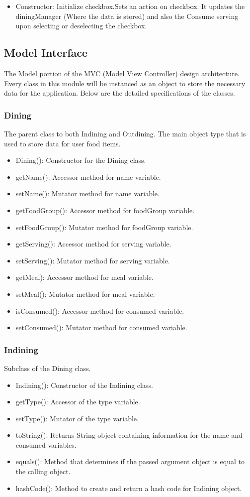 \documentclass{scrreprt}
\begin{document}
\begin{itemize}
	\item Constructor: Initialize checkbox.Sets an action on checkbox. It updates the diningManager (Where the data is stored) and also the Consume serving upon selecting or deselecting the checkbox.
\end{itemize}
\subsection{Model Interface}
The Model portion of the MVC (Model View Controller) design architecture. Every class in this module will be instanced as an object to store the necessary data for the application. Below are the detailed specifications of the classes.

\subsubsection{Dining}
The parent class to both Indining and Outdining. The main object type that is used to store data for user food items.
\begin{itemize}
\item Dining(): Constructor for the Dining class.
\item getName(): Accessor method for name variable.
\item setName(): Mutator method for name variable.
\item getFoodGroup(): Accessor method for foodGroup variable.
\item setFoodGroup(): Mutator method for foodGroup variable.
\item getServing(): Accessor method for serving variable.
\item setServing(): Mutator method for serving variable.
\item getMeal): Accessor method for meal variable.
\item setMeal(): Mutator method for meal variable.
\item isConsumed(): Accessor method for consumed variable.
\item setConsumed(): Mutator method for consumed variable.
\end{itemize}

\subsubsection{Indining}
Subclass of the Dining class.

\begin{itemize}
\item Indining(): Constructor of the Indining class.
\item getType(): Accessor of the type variable.
\item setType(): Mutator of the type variable.
\item toString(): Returns String object containing information for the name and consumed variables.
\item equals(): Method that determines if the passed argument object is equal to the calling object.
\item hashCode(): Method to create and return a hash code for Indining object.
\end{itemize}
\end{document}
